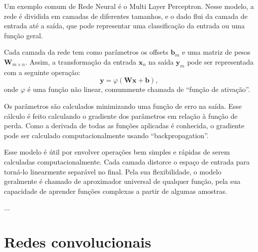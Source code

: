 Um exemplo comum de Rede Neural é o Multi Layer
Perceptron. Nesse modelo, a rede é dividida
em camadas de diferentes tamanhos, e o dado
flui da camada de entrada até a saída,
que pode representar uma classificação
da entrada ou uma função geral.


Cada camada da rede tem como parâmetros os offsets 
$\mathbf{b}_m$ e uma matriz de pesos $\mathbf{W}_{m\times n}$.
Assim, a transformação da entrada $\mathbf{x}_n$ na saída
$\mathbf{y}_m$ pode ser representada com a seguinte operação:
\begin{equation}
	\mathbf{y} = 
	\varphi\left( \mathbf{W}\mathbf{x} + \mathbf{b} \right),
\end{equation}
onde $\varphi$ é uma função não linear, comummente chamada
de ``função de ativação''.


Os parâmetros são calculados minimizando
uma função de erro na saída. Esse cálculo
é feito calculando o gradiente dos parâmetros
em relação à função de perda. Como a derivada
de todas as funções aplicadas é conhecida,
o gradiente pode ser calculado computacionalmente
usando ``backpropagation''.




Esse modelo é útil por envolver operações
bem simples e rápidas de serem calculadas
computacionalmente. Cada camada distorce
o espaço de entrada para torná-lo linearmente
separável no final. Pela sua flexibilidade,
o modelo geralmente é chamado de aproximador 
universal de qualquer função, pela
sua capacidade de aprender funções complexas
a partir de algumas amostras.


...

\section{Redes convolucionais}

